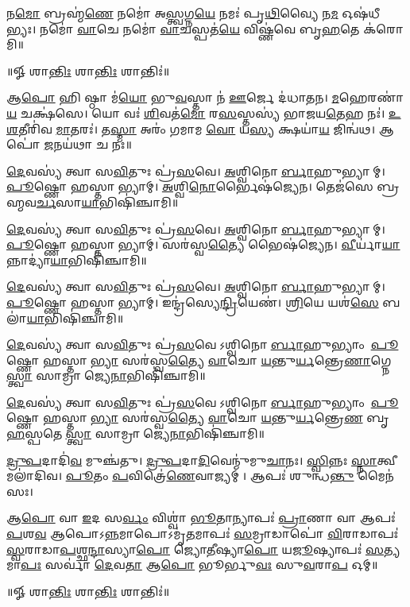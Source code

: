𑌨\ul{𑌮𑍋} 𑌬𑍍𑌰𑌹𑍍𑌮॑\ul{𑌣𑍇} 𑌨𑌮𑍋॑ 𑌅\ul{𑌸𑍍𑌤𑍍𑌵}𑌗𑍍𑌨\ul{𑌯𑍇} 𑌨𑌮𑌃॑ 𑌪𑍃\ul{𑌥𑌿}𑌵𑍍𑌯𑍈 𑌨\ul{𑌮} 𑌓𑌷॑𑌧𑍀𑌭𑍍𑌯𑌃।
𑌨𑌮𑍋॑ \ul{𑌵𑌾}𑌚𑍇 𑌨𑌮𑍋॑ \ul{𑌵𑌾}𑌚𑌸𑍍𑌪𑌤॑\ul{𑌯𑍇} 𑌵𑌿𑌷𑍍𑌣॑𑌵𑍇 𑌬𑍃\ul{𑌹}𑌤𑍇 𑌕॑𑌰𑍋𑌮𑌿॥

\centerline{॥𑍐 𑌶𑌾\ul{𑌨𑍍𑌤𑌿𑌃} 𑌶𑌾\ul{𑌨𑍍𑌤𑌿𑌃} 𑌶𑌾𑌨𑍍𑌤𑌿𑌃॑॥}


𑌆\ul{𑌪𑍋} 𑌹𑌿 𑌷𑍍𑌠𑌾 𑌮॑\ul{𑌯𑍋} 𑌭𑍁\ul{𑌵}𑌸𑍍𑌤𑌾 𑌨॑ \ul{𑌊}𑌰𑍍𑌜𑍇 𑌦॑𑌧𑌾𑌤𑌨।
\ul{𑌮}𑌹𑍇𑌰𑌣𑌾॑\ul{𑌯} 𑌚𑌕𑍍𑌷॑𑌸𑍇। 𑌯𑍋 𑌵𑌃॑ \ul{𑌶𑌿}𑌵𑌤॑\ul{𑌮𑍋} 𑌰\ul{𑌸}𑌸𑍍𑌤𑌸𑍍𑌯॑ 𑌭𑌾𑌜𑌯\ul{𑌤𑍇}𑌹 𑌨𑌃॑।
\ul{𑌉}\ul{𑌶}𑌤𑍀𑌰𑌿॑𑌵 \ul{𑌮𑌾}𑌤𑌰𑌃॑। 𑌤\ul{𑌸𑍍𑌮𑌾} 𑌅𑌰𑌂॑ 𑌗𑌮𑌾𑌮 \ul{𑌵𑍋} 𑌯\ul{𑌸𑍍𑌯} 𑌕𑍍𑌷𑌯𑌾॑\ul{𑌯} 𑌜𑌿𑌨𑍍𑌵॑𑌥।
𑌆𑌪𑍋॑ \ul{𑌜}𑌨𑌯॑𑌥𑌾 𑌚 𑌨𑌃॥

\ul{𑌦𑍇}𑌵𑌸𑍍𑌯॑ 𑌤𑍍𑌵𑌾 𑌸\ul{𑌵𑌿}𑌤𑍁𑌃 𑌪𑍍𑌰॑\ul{𑌸}𑌵𑍇। \ul{𑌅}𑌶𑍍𑌵𑌿𑌨𑍋\ul{𑌰𑍍𑌬𑌾}𑌹𑍁𑌭𑍍𑌯𑌾𑌮𑍍। \ul{𑌪𑍂}𑌷𑍍𑌣𑍋 𑌹𑌸𑍍𑌤𑌾𑌭𑍍𑌯𑌾𑌮𑍍।
\ul{𑌅}𑌶𑍍𑌵𑌿\ul{𑌨𑍋}𑌰𑍍𑌭𑍈𑌷॑𑌜𑍍𑌯𑍇𑌨। 𑌤𑍇𑌜॑𑌸𑍇 𑌬𑍍𑌰𑌹𑍍𑌮𑌵\ul{𑌰𑍍𑌚}𑌸𑌾\ul{𑌯𑌾}𑌭𑌿𑌷𑌿॑𑌞𑍍𑌚𑌾𑌮𑌿॥

\ul{𑌦𑍇}𑌵𑌸𑍍𑌯॑ 𑌤𑍍𑌵𑌾 𑌸\ul{𑌵𑌿}𑌤𑍁𑌃 𑌪𑍍𑌰॑\ul{𑌸}𑌵𑍇। \ul{𑌅}𑌶𑍍𑌵𑌿𑌨𑍋\ul{𑌰𑍍𑌬𑌾}𑌹𑍁𑌭𑍍𑌯𑌾𑌮𑍍। \ul{𑌪𑍂}𑌷𑍍𑌣𑍋 𑌹𑌸𑍍𑌤𑌾𑌭𑍍𑌯𑌾𑌮𑍍।
𑌸𑌰॑𑌸𑍍𑌵\ul{𑌤𑍍𑌯𑍈} 𑌭𑍈𑌷॑𑌜𑍍𑌯𑍇𑌨। \ul{𑌵𑍀}𑌰𑍍𑌯𑌾॑\ul{𑌯𑌾}𑌨𑍍𑌨𑌾𑌦𑍍𑌯𑌾॑\ul{𑌯𑌾}𑌭𑌿𑌷𑌿॑𑌞𑍍𑌚𑌾𑌮𑌿॥

\ul{𑌦𑍇}𑌵𑌸𑍍𑌯॑ 𑌤𑍍𑌵𑌾 𑌸\ul{𑌵𑌿}𑌤𑍁𑌃 𑌪𑍍𑌰॑\ul{𑌸}𑌵𑍇। \ul{𑌅}𑌶𑍍𑌵𑌿𑌨𑍋\ul{𑌰𑍍𑌬𑌾}𑌹𑍁𑌭𑍍𑌯𑌾𑌮𑍍। \ul{𑌪𑍂}𑌷𑍍𑌣𑍋 𑌹𑌸𑍍𑌤𑌾𑌭𑍍𑌯𑌾𑌮𑍍।
𑌇𑌨𑍍𑌦𑍍𑌰॑𑌸𑍍𑌯𑍇\ul{𑌨𑍍𑌦𑍍𑌰𑌿}𑌯𑍇𑌣॑। \ul{𑌶𑍍𑌰𑌿}𑌯𑍇 𑌯𑌶॑\ul{𑌸𑍇} 𑌬𑌲𑌾॑\ul{𑌯𑌾}𑌭𑌿𑌷𑌿॑𑌞𑍍𑌚𑌾𑌮𑌿॥

\ul{𑌦𑍇}𑌵𑌸𑍍𑌯॑ 𑌤𑍍𑌵𑌾 𑌸\ul{𑌵𑌿}𑌤𑍁𑌃 𑌪𑍍𑌰॑\ul{𑌸}𑌵𑍇𑌽𑌶𑍍𑌵𑌿𑌨𑍋\ul{𑌰𑍍𑌬𑌾}𑌹𑍁𑌭𑍍𑌯𑌾𑌂 \ul{𑌪𑍂}𑌷𑍍𑌣𑍋 𑌹𑌸𑍍𑌤𑌾\ul{𑌭𑍍𑌯𑌾}\ul{}
𑌸𑌰॑𑌸𑍍𑌵\ul{𑌤𑍍𑌯𑍈} \ul{𑌵𑌾}𑌚𑍋 \ul{𑌯}𑌨𑍍𑌤𑍁\ul{𑌰𑍍𑌯}𑌨𑍍𑌤𑍍𑌰𑍇\ul{𑌣𑌾}𑌗𑍍𑌨𑍇\ul{𑌸𑍍𑌤𑍍𑌵𑌾} 𑌸𑌾𑌮𑍍𑌰𑌾𑌜𑍍𑌯𑍇\ul{𑌨𑌾}𑌭𑌿𑌷𑌿॑𑌞𑍍𑌚𑌾𑌮𑌿॥

\ul{𑌦𑍇}𑌵𑌸𑍍𑌯॑ 𑌤𑍍𑌵𑌾 𑌸\ul{𑌵𑌿}𑌤𑍁𑌃 𑌪𑍍𑌰॑\ul{𑌸}𑌵𑍇𑌽𑌶𑍍𑌵𑌿𑌨𑍋\ul{𑌰𑍍𑌬𑌾}𑌹𑍁𑌭𑍍𑌯𑌾𑌂 \ul{𑌪𑍂}𑌷𑍍𑌣𑍋 𑌹𑌸𑍍𑌤𑌾\ul{𑌭𑍍𑌯𑌾}\ul{}
𑌸𑌰॑𑌸𑍍𑌵\ul{𑌤𑍍𑌯𑍈} \ul{𑌵𑌾}𑌚𑍋 \ul{𑌯}𑌨𑍍𑌤𑍁\ul{𑌰𑍍𑌯}𑌨𑍍𑌤𑍍𑌰𑍇\ul{𑌣} 𑌬𑍃\ul{𑌹}𑌸𑍍𑌪𑌤𑍇\ul{𑌸𑍍𑌤𑍍𑌵𑌾} 𑌸𑌾𑌮𑍍𑌰𑌾𑌜𑍍𑌯𑍇\ul{𑌨𑌾}𑌭𑌿𑌷𑌿॑𑌞𑍍𑌚𑌾𑌮𑌿॥

\ul{𑌦𑍍𑌰𑍁}\ul{𑌪}𑌦𑌾𑌦𑌿॑\ul{𑌵} 𑌮𑍁𑌞𑍍𑌚॑𑌤𑍁। \ul{𑌦𑍍𑌰𑍁}\ul{𑌪}𑌦𑌾\ul{𑌦𑌿}𑌵𑍇𑌨𑍍𑌮𑍁॑𑌮𑍁\ul{𑌚𑌾}𑌨𑌃।
\ul{𑌸𑍍𑌵𑌿}𑌨𑍍𑌨𑌃 \ul{𑌸𑍍𑌨𑌾}𑌤𑍍𑌵𑍀 𑌮𑌲𑌾॑𑌦𑌿𑌵। \ul{𑌪𑍂}𑌤𑌂 \ul{𑌪}𑌵𑌿𑌤𑍍𑌰𑍇॑\ul{𑌣𑍇}𑌵𑌾𑌜𑍍𑌯𑌮𑍍।
𑌆𑌪𑌃॑ 𑌶𑍁𑌨𑍍𑌧\ul{𑌨𑍍𑌤𑍁} 𑌮𑍈𑌨॑𑌸𑌃।

𑌆\ul{𑌪𑍋} 𑌵𑌾 \ul{𑌇}𑌦 𑌸\ul{𑌰𑍍𑌵𑌂} 𑌵𑌿𑌶𑍍𑌵𑌾॑ \ul{𑌭𑍂}𑌤𑌾𑌨𑍍𑌯𑌾𑌪𑌃॑ \ul{𑌪𑍍𑌰𑌾}𑌣𑌾 𑌵𑌾 𑌆𑌪𑌃॑ \ul{𑌪}𑌶\ul{𑌵} 𑌆𑌪𑍋𑌽\ul{𑌨𑍍𑌨}𑌮𑌾𑌪𑍋𑌽𑌮𑍃॑\ul{𑌤}𑌮𑌾𑌪𑌃॑ \ul{𑌸}𑌮𑍍𑌰𑌾𑌡𑌾𑌪𑍋॑ \ul{𑌵𑌿}𑌰𑌾𑌡𑌾𑌪𑌃॑ \ul{𑌸𑍍𑌵}𑌰𑌾𑌡𑌾\ul{𑌪}𑌶𑍍𑌛\ul{𑌨𑍍𑌦𑌾}\ul{}𑌸𑍍𑌯𑌾\ul{𑌪𑍋} 𑌜𑍍𑌯𑍋\ul{𑌤𑍀}\ul{}𑌷𑍍𑌯𑌾\ul{𑌪𑍋} 𑌯\ul{𑌜𑍂}\ul{}𑌷𑍍𑌯𑌾𑌪𑌃॑ \ul{𑌸}𑌤𑍍𑌯𑌮𑌾\ul{𑌪𑌃} 𑌸𑌰𑍍𑌵𑌾॑ \ul{𑌦𑍇}𑌵\ul{𑌤𑌾} 𑌆\ul{𑌪𑍋} 𑌭𑍂𑌰𑍍𑌭𑍁\ul{𑌵𑌃} 𑌸𑍁\ul{𑌵}𑌰𑌾\ul{𑌪} 𑌓𑌮𑍍॥

\centerline{॥𑍐 𑌶𑌾\ul{𑌨𑍍𑌤𑌿𑌃} 𑌶𑌾\ul{𑌨𑍍𑌤𑌿𑌃} 𑌶𑌾𑌨𑍍𑌤𑌿𑌃॑॥}
